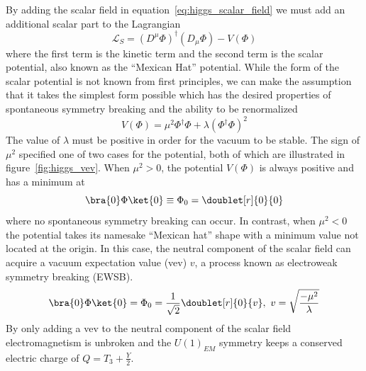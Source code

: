 By adding the scalar field in equation~\ref{eq:higgs_scalar_field} we must add an additional scalar part to the Lagrangian
\begin{equation}\label{eq:higgs_scalar_lagrangian}
	\mathcal{L}_{S}=\left(D^{\mu}\Phi\right)^{\dagger}\left(D_{\mu}\Phi\right)-V\left(\Phi\right)
\end{equation}
where the first term is the kinetic term and the second term is the scalar potential, also known as the ``Mexican Hat'' potential.
While the form of the scalar potential is not known from first principles, we can make the assumption that it takes the simplest form possible which has the desired properties of spontaneous symmetry breaking and the ability to be renormalized
\begin{equation}
	V\left(\Phi\right)=\mu^{2}\Phi^{\dagger}\Phi+\lambda\left(\Phi^{\dagger}\Phi\right)^{2}
\end{equation}
The value of $\lambda$ must be positive in order for the vacuum to be stable.
The sign of $\mu^{2}$ specified one of two cases for the potential, both of which are illustrated in figure~\ref{fig:higgs_vev}. 
When $\mu^{2}>0$, the potential $V\left(\Phi\right)$ is always positive and has a minimum at
\begin{equation}
	\bra{0}\Phi\ket{0}\equiv\Phi_{0}=\doublet[r]{0}{0}
\end{equation}
where no spontaneous symmetry breaking can occur.
In contrast, when $\mu^{2}<0$ the potential takes its namesake ``Mexican hat'' shape with a minimum value not located at the origin.
In this case, the neutral component of the scalar field can acquire a vacuum expectation value (vev) $v$, a process known as electroweak symmetry breaking (EWSB).
\begin{equation}
	\bra{0}\Phi\ket{0}=\Phi_{0}=\frac{1}{\sqrt{2}}\doublet[r]{0}{v},\text{ }v=\sqrt{\frac{-\mu^{2}}{\lambda}}
\end{equation}
By only adding a vev to the neutral component of the scalar field electromagnetism is unbroken and the $U\left(1\right)_{EM}$ symmetry keeps a conserved electric charge of $Q=T_{3}+\frac{Y}{2}$.

